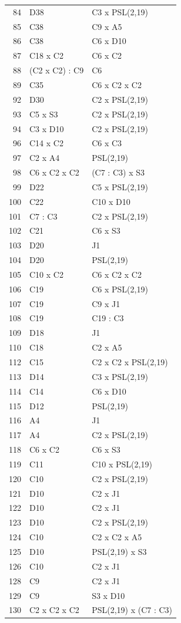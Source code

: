 \documentclass[10pt,a4paper]{article}
\begin{document}
\begin{longtable}{r p{77mm} p{53mm}}
84&D38&C3 x PSL(2,19)\\
85&C38&C9 x A5\\
86&C38&C6 x D10\\
87&C18 x C2&C6 x C2\\
88&(C2 x C2) : C9&C6\\
89&C35&C6 x C2 x C2\\
92&D30&C2 x PSL(2,19)\\
93&C5 x S3&C2 x PSL(2,19)\\
94&C3 x D10&C2 x PSL(2,19)\\
96&C14 x C2&C6 x C3\\
97&C2 x A4&PSL(2,19)\\
98&C6 x C2 x C2&(C7 : C3) x S3\\
99&D22&C5 x PSL(2,19)\\
100&C22&C10 x D10\\
101&C7 : C3&C2 x PSL(2,19)\\
102&C21&C6 x S3\\
103&D20&J1\\
104&D20&PSL(2,19)\\
105&C10 x C2&C6 x C2 x C2\\
106&C19&C6 x PSL(2,19)\\
107&C19&C9 x J1\\
108&C19&C19 : C3\\
109&D18&J1\\
110&C18&C2 x A5\\
112&C15&C2 x C2 x PSL(2,19)\\
113&D14&C3 x PSL(2,19)\\
114&C14&C6 x D10\\
115&D12&PSL(2,19)\\
116&A4&J1\\
117&A4&C2 x PSL(2,19)\\
118&C6 x C2&C6 x S3\\
119&C11&C10 x PSL(2,19)\\
120&C10&C2 x PSL(2,19)\\
121&D10&C2 x J1\\
122&D10&C2 x J1\\
123&D10&C2 x PSL(2,19)\\
124&C10&C2 x C2 x A5\\
125&D10&PSL(2,19) x S3\\
126&C10&C2 x J1\\
128&C9&C2 x J1\\
129&C9&S3 x D10\\
130&C2 x C2 x C2&PSL(2,19) x (C7 : C3)\\

\end{longtable}
\end{document}
